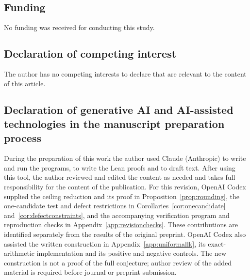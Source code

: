 \documentclass[screen,reqno]{aomart}
\numberwithin{equation}{section}
\theoremstyle{plain}
\theoremstyle{definition}
\theoremstyle{remark}
\begin{document}
\subsection*{Funding}
No funding was received for conducting this study.

\subsection*{Declaration of competing interest}
The author has no competing interests to declare that are relevant to
the content of this article.

\subsection*{Declaration of generative AI and AI-assisted technologies in the manuscript preparation process}
During the preparation of this work the author used Claude (Anthropic)
to write and run the programs, to write the Lean proofs and to draft
text. After using this tool, the author reviewed and edited the content
as needed and takes full responsibility for the content of the
publication. For this revision, OpenAI Codex supplied the ceiling
reduction and its proof in Proposition~\ref{prop:rounding}, the
one-candidate test and defect restrictions in
Corollaries~\ref{cor:onecandidate} and~\ref{cor:defectconstraints},
and the accompanying verification program and reproduction checks in
Appendix~\ref{app:revisionchecks}. These contributions are identified
separately from the results of the original preprint.
OpenAI Codex also assisted the written construction in
Appendix~\ref{app:uniformallk}, its exact-arithmetic implementation
and its positive and negative controls. The new construction is not
a proof of the full conjecture; author review of the added material
is required before journal or preprint submission.
\end{document}
